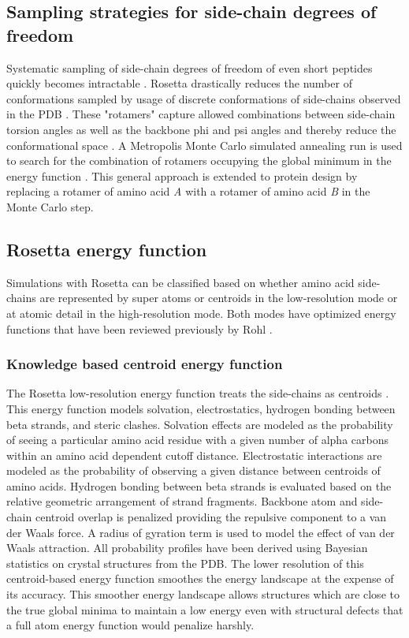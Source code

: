 \subsection{Sampling strategies for side-chain degrees of freedom}
Systematic sampling of side-chain degrees of freedom of even short peptides quickly becomes intractable  \citep{Levinthal:1968vd}.
Rosetta drastically reduces the number of conformations sampled by usage of discrete conformations of side-chains observed in the PDB  \citep{Kuhlman:2000tc,Dunbrack:1993jt}.
These "rotamers" capture allowed combinations between side-chain torsion angles as well as the backbone phi and psi angles and thereby reduce the conformational space  \citep{Dunbrack:1993jt}.
A Metropolis Monte Carlo simulated annealing run is used to search for the combination of rotamers occupying the global minimum in the energy function  \citep{Kuhlman:2000tc,LeaverFay:2005vc}.
This general approach is extended to protein design by replacing a rotamer of amino acid \textit{A} with a rotamer of amino acid \textit{B} in the Monte Carlo step.

\subsection{Rosetta energy function}
Simulations with Rosetta can be classified based on whether amino acid side-chains are represented by super atoms or centroids in the low-resolution mode or at atomic detail in the high-resolution mode.
Both modes have optimized energy functions that have been reviewed previously by Rohl  \citep{Rohl:2004dh}.

\subsubsection{Knowledge based centroid energy function}
The Rosetta low-resolution energy function treats the side-chains as centroids  \citep{Simons:1997do,Simons:1999wp}.
This energy function models solvation, electrostatics, hydrogen bonding between beta strands, and steric clashes.
Solvation effects are modeled as the probability of seeing a particular amino acid residue with a given number of alpha carbons within an amino acid dependent cutoff distance.
Electrostatic interactions are modeled as the probability of observing a given distance between centroids of amino acids.
Hydrogen bonding between beta strands is evaluated based on the relative geometric arrangement of strand fragments.
Backbone atom and side-chain centroid overlap is penalized providing the repulsive component to a van der Waals force.
A radius of gyration term is used to model the effect of van der Waals attraction.
All probability profiles have been derived using Bayesian statistics on crystal structures from the \ac{PDB}.
The lower resolution of this centroid-based energy function smoothes the energy landscape at the expense of its accuracy.
This smoother energy landscape allows structures which are close to the true global minima to maintain a low energy even with structural defects that a full atom energy function would penalize harshly.

